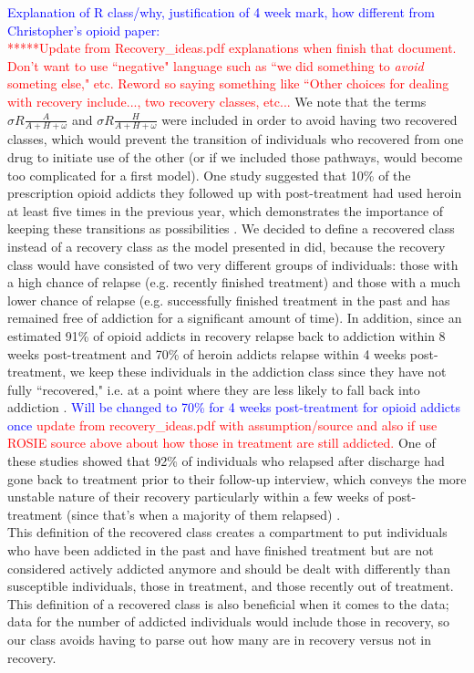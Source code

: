 \documentclass[12pt]{article}
\begin{document}
\textcolor{blue}{Explanation of R class/why, justification of 4 week mark, how different from Christopher's opioid paper:} \\
\textcolor{red}{*****Update from Recovery\_ideas.pdf explanations when finish that document.}\\
\textcolor{red}{Don't want to use ``negative" language such as ``we did something to \textit{avoid} someting else," etc. Reword so saying something like ``Other choices for dealing with recovery include..., two recovery classes, etc...} We note that the terms $\sigma R \frac{A}{A+H+\omega}$ and $\sigma R \frac{H}{A+H+\omega}$ were included in order to avoid having two recovered classes, which would prevent the transition of individuals who recovered from one drug to initiate use of the other (or if we included those pathways, would become too complicated for a first model). One study suggested that 10\% of the prescription opioid addicts they followed up with post-treatment had used heroin at least five times in the previous year, which demonstrates the importance of keeping these transitions as possibilities \cite{Weiss}. We decided to define a recovered class instead of a recovery class as the model presented in \cite{Battista} did, because the recovery class would have consisted of two very different groups of individuals: those with a high chance of relapse (e.g. recently finished treatment) and those with a much lower chance of relapse (e.g. successfully finished treatment in the past and has remained free of addiction for a significant amount of time). In addition, since an estimated 91\% of opioid addicts in recovery relapse back to addiction within 8 weeks post-treatment and 70\% of heroin addicts relapse within 4 weeks post-treatment, we keep these individuals in the addiction class since they have not fully ``recovered," i.e. at a point where they are less likely to fall back into addiction \cite{Weiss, Smyth}. \textcolor{blue}{Will be changed to 70\% for 4 weeks post-treatment for opioid addicts once \textcolor{red}{update from recovery\_ideas.pdf with assumption/source and also if use ROSIE source above about how those in treatment are still addicted.}} One of these studies showed that 92\% of individuals who relapsed after discharge had gone back to treatment prior to their follow-up interview, which conveys the more unstable nature of their recovery particularly within a few weeks of post-treatment (since that's when a majority of them relapsed) \cite{Smyth}. \\ This definition of the recovered class creates a compartment to put individuals who have been addicted in the past and have finished treatment but are not considered actively addicted anymore and should be dealt with differently than susceptible individuals, those in treatment, and those recently out of treatment. This definition of a recovered class is also beneficial when it comes to the data; data for the number of addicted individuals would include those in recovery, so our class avoids having to parse out how many are in recovery versus not in recovery.  \\ 
\end{document}
